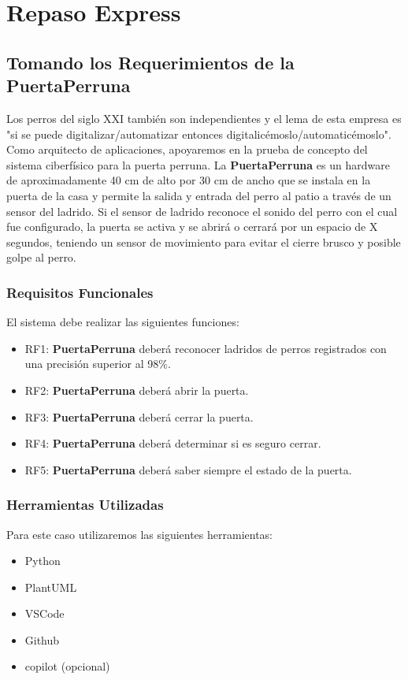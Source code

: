 
\chapter{Repaso Express}
\vspace{160pt}

\section{Tomando los Requerimientos de la PuertaPerruna}

\begin{tcolorbox}[colback=gray!5!white,colframe=orange!60!gray,title=PuertaPerruna]
Los perros del siglo XXI también son independientes y el lema de esta empresa es "si se puede digitalizar/automatizar entonces digitalicémoslo/automaticémoslo". Como arquitecto de aplicaciones, apoyaremos en la prueba de concepto del sistema ciberfísico para la puerta perruna. La \textbf{PuertaPerruna} es un hardware de aproximadamente 40 cm de alto por 30 cm de ancho que se instala en la puerta de la casa y permite la salida y entrada del perro al patio a través de un sensor del ladrido. Si el sensor de ladrido reconoce el sonido del perro con el cual fue configurado, la puerta se activa y se abrirá o cerrará por un espacio de X segundos, teniendo un sensor de movimiento para evitar el cierre brusco y posible golpe al perro.
\end{tcolorbox}

\subsection{Requisitos Funcionales}
El sistema debe realizar las siguientes funciones:
\begin{itemize}
    \item RF1: \textbf{PuertaPerruna} deberá reconocer ladridos de perros registrados con una precisión superior al 98\%.
    \item RF2: \textbf{PuertaPerruna} deberá abrir la puerta.
    \item RF3: \textbf{PuertaPerruna} deberá cerrar la puerta.
    \item RF4: \textbf{PuertaPerruna} deberá determinar si es seguro cerrar.
    \item RF5: \textbf{PuertaPerruna} deberá saber siempre el estado de la puerta.
\end{itemize}

\subsection{Herramientas Utilizadas}
Para este caso utilizaremos las siguientes herramientas:
\begin{itemize}
    \item Python
    \item PlantUML
    \item VSCode
    \item Github
    \item copilot (opcional)
\end{itemize}

